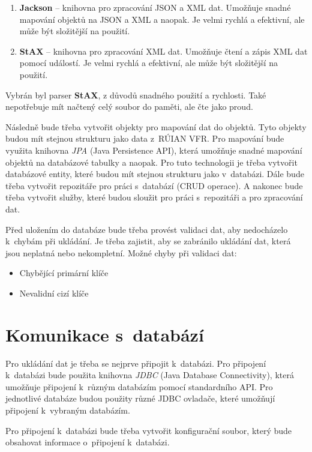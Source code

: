\begin{enumerate}
    \item \textbf{Jackson} -- knihovna pro zpracování JSON a XML dat. Umožňuje snadné mapování 
    objektů na JSON a XML a naopak. Je velmi rychlá a efektivní, ale může být složitější na použití.
    \item \textbf{StAX} -- knihovna pro zpracování XML dat. Umožňuje 
    čtení a zápis XML dat pomocí událostí. Je velmi rychlá a efektivní, ale může být 
    složitější na použití.
\end{enumerate}

Vybrán byl parser \textbf{StAX}, z důvodů snadného použití a rychlosti.
Také nepotřebuje mít načtený celý soubor do paměti, ale čte jako proud.

Následně bude třeba vytvořit objekty pro mapování dat do objektů.
Tyto objekty budou mít stejnou strukturu jako data z~RÚIAN VFR.
Pro mapování bude využita knihovna \textit{JPA} (Java Persistence API), která umožňuje snadné 
mapování objektů na databázové tabulky a naopak.
Pro tuto technologii je třeba vytvořit databázové entity, které budou mít stejnou strukturu jako
v~databázi. Dále bude třeba vytvořit repozitáře pro práci s~databází (CRUD operace).
A nakonec bude třeba vytvořit služby, které budou sloužit pro práci s~repozitáři a pro zpracování dat.

Před uložením do databáze bude třeba provést validaci dat, aby nedocházelo k~chybám při
ukládání. Je třeba zajistit, aby se zabránilo ukládání dat, která jsou neplatná nebo nekompletní.
Možné chyby při validaci dat:
\begin{itemize}
    \item Chybějící primární klíče
    \item Nevalidní cizí klíče
\end{itemize}

\section{Komunikace s~databází}
\label{sec:komunikaceDB}
Pro ukládání dat je třeba se nejprve připojit k~databázi.
Pro připojení k~databázi bude použita knihovna \textit{JDBC} (Java Database Connectivity), která
umožňuje připojení k~různým databázím pomocí standardního API.
Pro jednotlivé databáze budou použity různé JDBC ovladače, které umožňují připojení k~vybraným databázím.

Pro připojení k~databázi bude třeba vytvořit konfigurační soubor, který bude obsahovat
informace o~připojení k~databázi.

